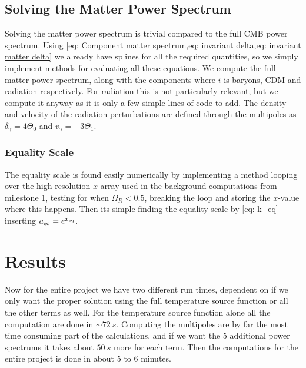 \documentclass[10pt,a4paper]{article}
\providecommand{\rCDM}
{\ensuremath{
\textrm{CDM}
}
}
\begin{document}
\subsection{Solving the Matter Power Spectrum}
\label{subsec:Method/solving matter power spectrum}
Solving the matter power spectrum is trivial compared to the full CMB power spectrum. Using \cref{eq: Component matter spectrum,eq: invariant delta,eq: invariant matter delta} we already have splines for all the required quantities, so we simply implement methods for evaluating all these equations. We compute the full matter power spectrum, along with the components where $i$ is baryons, \rCDM and radiation respectively. For radiation this is not particularly relevant, but we compute it anyway as it is only a few simple lines of code to add. The density and velocity of the radiation perturbations are defined through the multipoles as $\delta_\gamma = 4\Theta_0$ and $v_\gamma = -3\Theta_1$.

\subsubsection{Equality Scale}
\label{subsubsec:Method/Equality Scale}
The equality scale is found easily numerically by implementing a method looping over the high resolution $x$-array used in the background computations from milestone 1, testing for when $\Omega_R<0.5$, breaking the loop and storing the $x$-value where this happens. Then its simple finding the equality scale by \cref{eq: k_eq} inserting $a_{\rm{eq}} = e^{x_{\rm{eq}}}$.



\section{Results}
\label{sec:Results}
Now for the entire project we have two different run times, dependent on if we only want the proper solution using the full temperature source function or all the other terms as well. For the temperature source function alone all the computation are done in $\sim \SI{72}{s}$. Computing the multipoles are by far the most time consuming part of the calculations, and if we want the 5 additional power spectrums it takes about $\SI{50}{s}$ more for each term. Then the computations for the entire project is done in about $5$ to $6$ minutes.
\end{document}
